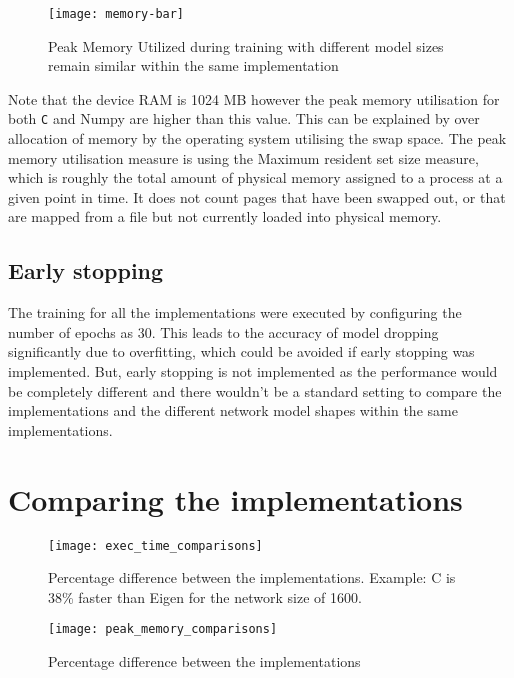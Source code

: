 \begin{figure}[!ht]
	\centering
	\texttt{[image: memory-bar]}
	\caption[Peak Memory Utilisation]{Peak Memory Utilized during training with different model sizes remain similar within the same implementation}
\end{figure}


Note that the device RAM is 1024 MB however the peak memory utilisation for both \texttt{C} and Numpy are higher than this value. This can be explained by over allocation of memory by the operating system utilising the swap space. The peak memory utilisation measure is using the Maximum resident set size measure, which is roughly the total amount of physical memory assigned to a process at a given point in time. It does not count pages that have been swapped out, or that are mapped from a file but not currently loaded into physical memory.

\subsection{Early stopping}

The training for all the implementations were executed by configuring the number of epochs as 30. This leads to the accuracy of model dropping significantly due to overfitting, which could be avoided if early stopping was implemented. But, early stopping is not implemented as the performance would be completely different and there wouldn't be a standard setting to compare the implementations and the different network model shapes within the same implementations.

\section{Comparing the implementations}

\begin{figure}[!ht]
	\centering
	\texttt{[image: exec\_time\_comparisons]}
	\caption[Execution Time vs Model Parameters]{Percentage difference between the implementations. Example: C is 38\% faster than Eigen for the network size of 1600.}
\end{figure}

\begin{figure}[ht]
	\centering
	\texttt{[image: peak\_memory\_comparisons]}
	\caption[Peak Memory Utilisation]{Percentage difference between the implementations}
\end{figure}

